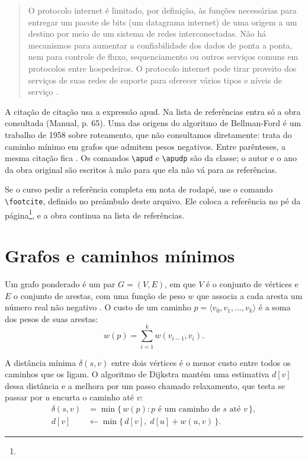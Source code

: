 \documentclass[tese,capa]{texufpel}
\newcommand{\footcite}[1]{\footnote{\bibentry{#1}}}
\begin{document}
\begin{quote}
O protocolo internet é limitado, por definição, às funções necessárias para
entregar um pacote de bits (um datagrama internet) de uma origem a um destino
por meio de um sistema de redes interconectadas. Não há mecanismos para
aumentar a confiabilidade dos dados de ponta a ponta, nem para controle de
fluxo, sequenciamento ou outros serviços comuns em protocolos entre
hospedeiros. O protocolo internet pode tirar proveito dos serviços de suas
redes de suporte para oferecer vários tipos e níveis de serviço
\citep[p.~1, tradução nossa]{Postel:1981:IP}.
\end{quote}

A citação de citação usa a expressão apud. Na lista de referências entra só a
obra consultada (Manual, p. 65). Uma das origens do algoritmo de Bellman-Ford é um
trabalho de 1958 sobre roteamento, que não consultamos diretamente:
 trata do caminho mínimo em grafos que
admitem pesos negativos. Entre parênteses, a mesma citação fica
. Os comandos \verb|\apud| e
\verb|\apudp| são da classe; o autor e o ano da obra original são escritos à
mão para que ela não vá para as referências.

Se o curso pedir a referência completa em nota de rodapé, use o comando
\verb|\footcite|, definido no preâmbulo deste arquivo. Ele coloca a referência
no pé da página\footcite{Postel:1981:IP}, e a obra continua na lista de
referências.

\section{Grafos e caminhos mínimos}
\label{sec:grafos}

Um grafo ponderado é um par $G = (V, E)$, em que $V$ é o conjunto de vértices
e $E$ o conjunto de arestas, com uma função de peso $w$ que associa a cada
aresta um número real não negativo \citep{Cormen:2022:IA}. O custo de um
caminho $p = \langle v_0, v_1, \dots, v_k \rangle$ é a soma dos pesos de suas
arestas:
\begin{equation}
  w(p) = \sum_{i=1}^{k} w(v_{i-1}, v_i).
  \label{eq:custo}
\end{equation}

A distância mínima $\delta(s, v)$ entre dois vértices é o menor custo entre
todos os caminhos que os ligam. O algoritmo de Dijkstra mantém uma estimativa
$d[v]$ dessa distância e a melhora por um passo chamado relaxamento, que
testa se passar por $u$ encurta o caminho até $v$:
\begin{align}
  \delta(s, v) &= \min \{\, w(p) : p \text{ é um caminho de } s \text{ até } v \,\},
  \label{eq:delta}\\
  d[v] &\leftarrow \min \{\, d[v],\; d[u] + w(u, v) \,\}.
  \label{eq:relax}
\end{align}
\end{document}
